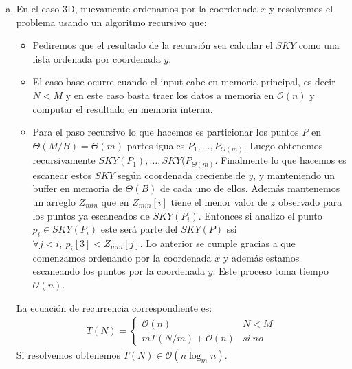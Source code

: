 \documentclass[dcc,uchile]{fcfmcourse}
\begin{document}
\begin{problems}
\begin{enumerate}[a)]
    \item En el caso 3D, nuevamente ordenamos por la coordenada $x$ y resolvemos el problema usando un algoritmo recursivo que:
    \begin{itemize}
        \item Pediremos que el resultado de la recursión sea calcular el $SKY$ como una lista ordenada por coordenada $y$.
        \item El caso base ocurre cuando el input cabe en memoria principal, es decir $N<M$ y en este caso basta traer los datos a memoria en $\mathcal{O}(n)$ y computar el resultado en memoria interna.
        \item Para el paso recursivo lo que hacemos es particionar los puntos $P$ en $\Theta(M/B) = \Theta(m)$ partes iguales $P_{1},\ldots,P_{\Theta(m)}$. Luego obtenemos recursivamente $SKY(P_{1}),\ldots, SKY(P_{\Theta(m)}$. Finalmente lo que hacemos es escanear estos $SKY$ según coordenada creciente de $y$, y manteniendo un buffer en memoria de $\Theta(B)$ de cada uno de ellos. Además mantenemos un arreglo $Z_{min}$ que en $Z_{min}[i]$ tiene el menor valor de $z$ observado para los puntos ya escaneados de $SKY(P_{i})$. Entonces si analizo el punto $p_{i} \in SKY(P_{i})$ este será parte del $SKY(P)$ ssi $\forall j < i,\ p_{i}[3] < Z_{min}[j]$. Lo anterior se cumple gracias a que comenzamos ordenando por la coordenada $x$ y además estamos escaneando los puntos por la coordenada $y$. Este proceso toma tiempo $\mathcal{O}(n)$.
    \end{itemize}
    La ecuación de recurrencia correspondiente es:
    \begin{align*}
        T(N) = 
        \begin{cases} 
      \mathcal{O}(n) & N < M \\ mT(N/m) + \mathcal{O}(n) & si\ no
   \end{cases}
    \end{align*}
    Si resolvemos obtenemos $T(N) \in \mathcal{O}(n\log_{m}n)$. \wedidit
\end{enumerate}
\end{problems}
\end{document}
